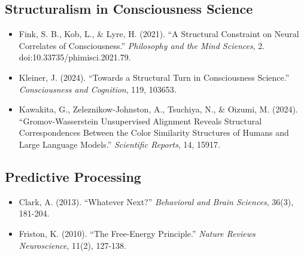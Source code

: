 \documentclass[11pt,letterpaper]{article}
\begin{document}
\subsection*{Structuralism in Consciousness Science}
\begin{itemize}[leftmargin=1.5em]
  \item Fink, S. B., Kob, L., \& Lyre, H. (2021). ``A Structural Constraint on Neural Correlates of Consciousness.'' \textit{Philosophy and the Mind Sciences}, 2. doi:10.33735/phimisci.2021.79.
  \item Kleiner, J. (2024). ``Towards a Structural Turn in Consciousness Science.'' \textit{Consciousness and Cognition}, 119, 103653.
  \item Kawakita, G., Zeleznikow-Johnston, A., Tsuchiya, N., \& Oizumi, M. (2024). ``Gromov-Wasserstein Unsupervised Alignment Reveals Structural Correspondences Between the Color Similarity Structures of Humans and Large Language Models.'' \textit{Scientific Reports}, 14, 15917.
\end{itemize}

\subsection*{Predictive Processing}
\begin{itemize}[leftmargin=1.5em]
  \item Clark, A. (2013). ``Whatever Next?'' \textit{Behavioral and Brain Sciences}, 36(3), 181-204.
  \item Friston, K. (2010). ``The Free-Energy Principle.'' \textit{Nature Reviews Neuroscience}, 11(2), 127-138.
\end{itemize}
\end{document}
